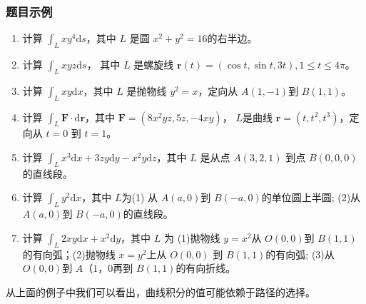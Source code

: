 \subsubsection{题目示例}
\begin{enumerate}
    \item 计算 $\int _L xy^4 \mathrm{d}s$，其中 $L$ 是圆 $x^2+y^2=16$的右半边。

    \item 计算 $\int _L xyz \mathrm{d} s $， 其中 $L$ 是螺旋线 $\mathbf{r}(t) =(\cos t , \sin t, 3t), 1 \le t \le 4 \pi$。

    \item 计算 $\int _L xy \mathrm{d}x$，其中 $L$ 是抛物线 $y^2=x$，定向从 $A(1,-1)$到 $B(1,1)$。

    \item 计算 $\int _L \mathbf{F} \cdot \mathrm{d} \mathbf{r}$，其中 $\mathbf{F} = (8x^2yz, 5z, -4xy)$， $L$是曲线 $\mathbf{r}=(t,t^2,t^3)$，定向从 $t=0$ 到 $t=1$。

    \item 计算 $\int _L x^3 \mathrm{d} x + 3zy \mathrm{d}y - x^2y \mathrm{d}z$，其中 $L$ 是从点 $A(3,2,1)$ 到点 $B(0,0,0)$ 的直线段。

    \item 计算 $\int _L y^2 \mathrm{d}x$，其中 $L$为(1) 从 $A(a,0)$到 $B(-a,0)$的单位圆上半圆; (2)从 $A(a,0)$到 $B(-a,0)$的直线段。

    \item 计算 $\int _L 2xy \mathrm{d}x + x^2 \mathrm{d}y$，其中 $L$ 为 (1)抛物线 $y=x^2$从 $O(0,0)$到 $B(1,1)$的有向弧；(2)抛物线 $x=y^2$上从 $O(0,0)$ 到 $B(1,1)$的有向弧; (3)从 $O(0,0)$到 $A（1，0$再到 $B(1,1)$的有向折线。
\end{enumerate}
从上面的例子中我们可以看出，曲线积分的值可能依赖于路径的选择。

